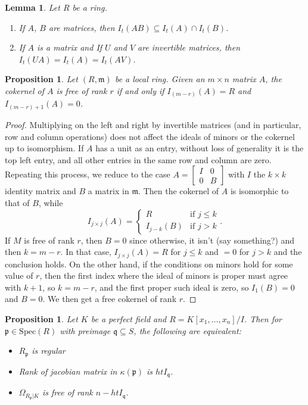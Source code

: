 \documentclass{amsart}[12pt]
\newcommand{\Spec}{\mathrm{Spec}}
\newcommand{\fp}{{\mathfrak p}}
\newcommand{\fm}{{\mathfrak m}}
\newcommand{\fq}{{\mathfrak q}}
\numberwithin{equation}{section}
\theoremstyle{plain} %
\newtheorem{lem}[equation]{Lemma}
\newtheorem{prop}[equation]{Proposition}
\theoremstyle{definition}
\theoremstyle{remark}
\begin{document}
\begin{lem} Let $R$ be a ring.
\begin{enumerate}
\item If $A$, $B$ are matrices, then $I_t(AB) \subseteq I_t(A) \cap I_t(B)$.
\item If $A$ is a matrix and If $U$ and $V$ are invertible matrices, then $I_t(UA) = I_t(A) = I_t(AV)$.
\end{enumerate}
\end{lem}

\begin{prop}
Let $(R,\fm)$ be a local ring. Given an $m\times n$ matrix $A$, the cokernel of $A$ is free of rank $r$ if and only if $I_{(m-r)}(A)=R$ and $I_{(m-r)+1}(A)=0$.
\end{prop}
\begin{proof}Multiplying on the left and right by invertible matrices (and in particular, row and column operations) does not affect the ideals of minors or the cokernel up to isomorphism. If $A$ has a unit as an entry, without loss of generality it is the top left entry, and all other entries in the same row and column are zero. Repeating this process,
we reduce to the case $A= \begin{bmatrix} I & 0 \\ 0 & B\end{bmatrix}$ with $I$ the $k\times k$ identity matrix and $B$ a matrix in $\fm$. 
Then the cokernel of $A$ is isomorphic to that of $B$, while \[ I_{j\times j}(A)=\begin{cases} R & \text{if } j\leq k \\ I_{j-k}(B) & \text{if } j > k\end{cases}.\]
If $M$ is free of rank $r$, then $B=0$ since otherwise, it isn't (say something?) and then $k=m-r$. In that case, $I_{j\times j}(A) = R$ for $j\leq k$ and $=0$ for $j>k$ and the conclusion holds. On the other hand, if the conditions on minors hold for some value of $r$, then the first index where the ideal of minors is proper must agree with $k+1$, so $k=m-r$, and the first proper such ideal is zero, so $I_1(B)=0$ and $B=0$. We then get a free cokernel of rank $r$.
\end{proof}

\begin{prop} Let $K$ be a perfect field and $R=K[x_1,\dots,x_n]/I$. Then for $\fp\in \Spec(R)$ with preimage $\fq\subseteq S$, the following are equivalent:
\begin{itemize}
\item $R_\fp$ is regular
\item Rank of jacobian matrix in $\kappa(\fp)$ is $ht I_\fq$.
\item $\Omega_{R_\fp|K}$ is free of rank $n-ht I_\fq$.
\end{itemize}
\end{prop}
\end{document}

